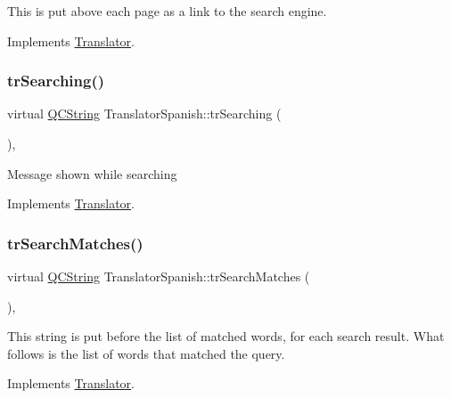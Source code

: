 This is put above each page as a link to the search engine. 

Implements \mbox{\hyperlink{class_translator}{Translator}}.

\mbox{\label{class_translator_spanish_a383353d3259701d97f5df7ebbfd6e578}} 
\subsubsection{\texorpdfstring{trSearching()}{trSearching()}}
{\footnotesize\ttfamily virtual \mbox{\hyperlink{class_q_c_string}{Q\+C\+String}} Translator\+Spanish\+::tr\+Searching (\begin{DoxyParamCaption}{ }\end{DoxyParamCaption})\hspace{0.3cm}{\ttfamily [inline]}, {\ttfamily [virtual]}}

Message shown while searching 

Implements \mbox{\hyperlink{class_translator}{Translator}}.

\mbox{\label{class_translator_spanish_a9d890d8bad3e699faf979943e32146ce}} 
\subsubsection{\texorpdfstring{trSearchMatches()}{trSearchMatches()}}
{\footnotesize\ttfamily virtual \mbox{\hyperlink{class_q_c_string}{Q\+C\+String}} Translator\+Spanish\+::tr\+Search\+Matches (\begin{DoxyParamCaption}{ }\end{DoxyParamCaption})\hspace{0.3cm}{\ttfamily [inline]}, {\ttfamily [virtual]}}

This string is put before the list of matched words, for each search result. What follows is the list of words that matched the query. 

Implements \mbox{\hyperlink{class_translator}{Translator}}.

\mbox{\label{class_translator_spanish_aaf0906ea32305a3d43fbdbc5be4f0764}} 

